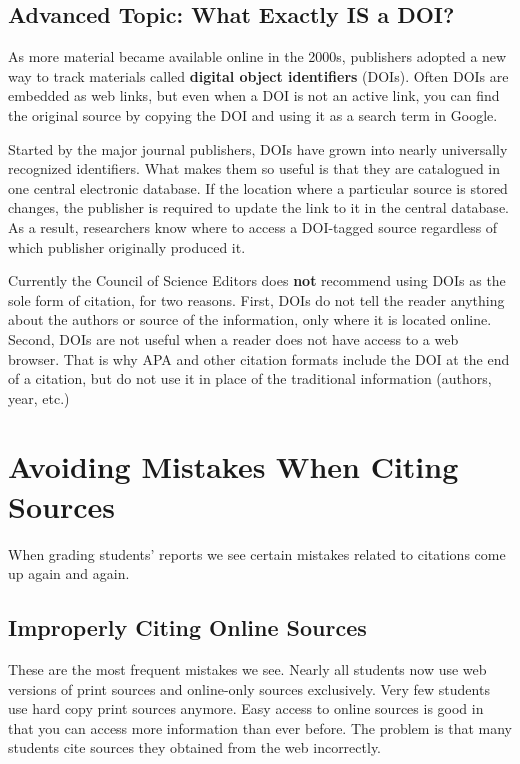 \documentclass[
]{book}
\begin{document}
\hypertarget{advanced-topic-what-exactly-is-a-doi}{%
\section{Advanced Topic: What Exactly IS a DOI?}\label{advanced-topic-what-exactly-is-a-doi}}

As more material became available online in the 2000s, publishers adopted a new way to track materials called \textbf{digital object identifiers} (DOIs). Often DOIs are embedded as web links, but even when a DOI is not an active link, you can find the original source by copying the DOI and using it as a search term in Google.

Started by the major journal publishers, DOIs have grown into nearly universally recognized identifiers. What makes them so useful is that they are catalogued in one central electronic database. If the location where a particular source is stored changes, the publisher is required to update the link to it in the central database. As a result, researchers know where to access a DOI-tagged source regardless of which publisher originally produced it.

Currently the Council of Science Editors does \textbf{not} recommend using DOIs as the sole form of citation, for two reasons. First, DOIs do not tell the reader anything about the authors or source of the information, only where it is located online. Second, DOIs are not useful when a reader does not have access to a web browser. That is why APA and other citation formats include the DOI at the end of a citation, but do not use it in place of the traditional information (authors, year, etc.)

\hypertarget{citmistakes515}{%
\chapter{Avoiding Mistakes When Citing Sources}\label{citmistakes515}}

When grading students' reports we see certain mistakes related to citations come up again and again.

\hypertarget{improperly-citing-online-sources}{%
\section{Improperly Citing Online Sources}\label{improperly-citing-online-sources}}

These are the most frequent mistakes we see. Nearly all students now use web versions of print sources and online-only sources exclusively. Very few students use hard copy print sources anymore. Easy access to online sources is good in that you can access more information than ever before. The problem is that many students cite sources they obtained from the web incorrectly.
\end{document}
